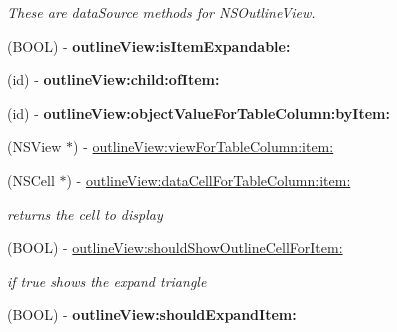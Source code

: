 \begin{DoxyCompactItemize}
\begin{DoxyCompactList}\small\item\em These are data\+Source methods for N\+S\+Outline\+View. \end{DoxyCompactList}\item 
\mbox{\label{interface_captured_traffic_a62ec426aa8a586c5c9ffabf399d964fe}} 
(B\+O\+OL) -\/ {\bfseries outline\+View\+:is\+Item\+Expandable\+:}
\item 
\mbox{\label{interface_captured_traffic_a0f13201fd16c07b5ebe47c7a4bb843ab}} 
(id) -\/ {\bfseries outline\+View\+:child\+:of\+Item\+:}
\item 
\mbox{\label{interface_captured_traffic_a447c2410e55e08847977062de9fcc513}} 
(id) -\/ {\bfseries outline\+View\+:object\+Value\+For\+Table\+Column\+:by\+Item\+:}
\item 
(N\+S\+View $\ast$) -\/ \hyperlink{interface_captured_traffic_a819263857354e5b56f58dbe5995aaf8c}{outline\+View\+:view\+For\+Table\+Column\+:item\+:}
\item 
\mbox{\label{interface_captured_traffic_afb2e31d71090a37c29453ae53633c0e8}} 
(N\+S\+Cell $\ast$) -\/ \hyperlink{interface_captured_traffic_afb2e31d71090a37c29453ae53633c0e8}{outline\+View\+:data\+Cell\+For\+Table\+Column\+:item\+:}
\begin{DoxyCompactList}\small\item\em returns the cell to display \end{DoxyCompactList}\item 
\mbox{\label{interface_captured_traffic_aa8f74331f08776a7ff30a6cad7f48783}} 
(B\+O\+OL) -\/ \hyperlink{interface_captured_traffic_aa8f74331f08776a7ff30a6cad7f48783}{outline\+View\+:should\+Show\+Outline\+Cell\+For\+Item\+:}
\begin{DoxyCompactList}\small\item\em if true shows the expand triangle \end{DoxyCompactList}\item 
\mbox{\label{interface_captured_traffic_a4615e3cad4f8a4b7443096c1180cd791}} 
(B\+O\+OL) -\/ {\bfseries outline\+View\+:should\+Expand\+Item\+:}

\end{DoxyCompactItemize}

